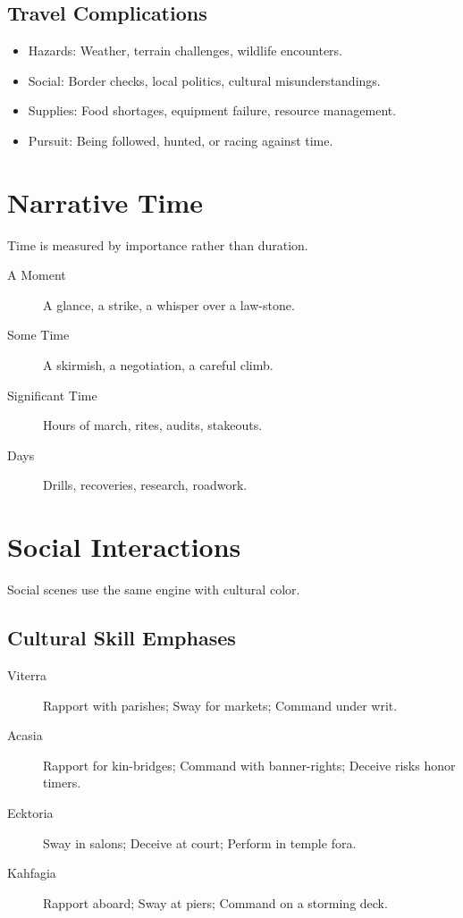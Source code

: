 \documentclass[11pt,twoside,openany]{book}
\begin{document}
\subsection*{Travel Complications}

\begin{itemize}
\item Hazards: Weather, terrain challenges, wildlife encounters.
\item Social: Border checks, local politics, cultural misunderstandings.
\item Supplies: Food shortages, equipment failure, resource management.
\item Pursuit: Being followed, hunted, or racing against time.
\end{itemize}

\section*{Narrative Time} 

Time is measured by importance rather than duration.

\begin{description}
\item[A Moment] A glance, a strike, a whisper over a law-stone.
\item[Some Time] A skirmish, a negotiation, a careful climb.
\item[Significant Time] Hours of march, rites, audits, stakeouts.
\item[Days] Drills, recoveries, research, roadwork.
\end{description}

\section*{Social Interactions} 

Social scenes use the same engine with cultural color.

\subsection*{Cultural Skill Emphases}

\begin{description}
\item[Viterra] Rapport with parishes; Sway for markets; Command under writ.
\item[Acasia] Rapport for kin-bridges; Command with banner-rights; Deceive risks honor timers.
\item[Ecktoria] Sway in salons; Deceive at court; Perform in temple fora.
\item[Kahfagia] Rapport aboard; Sway at piers; Command on a storming deck.
\end{description}
\end{document}
